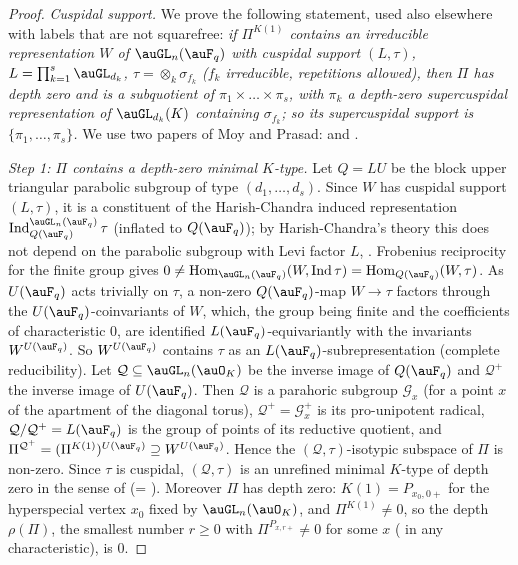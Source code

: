 \documentclass[10pt]{amsart}
\theoremstyle{definition}
\theoremstyle{remark}
\begin{document}
\begin{proof}
\emph{Cuspidal support.} We prove the following statement, used also elsewhere with labels that
are not squarefree: \emph{if $\Pi^{K(1)}$ contains an irreducible representation $W$ of
$\auGL_n(\auF_q)$ with cuspidal support $(L,\tau)$, $L=\prod_{k=1}^s\auGL_{d_k}$,
$\tau=\otimes_k\sigma_{f_k}$ ($f_k$ irreducible, repetitions allowed), then $\Pi$ has depth zero and
is a subquotient of $\pi_1\times\dots\times\pi_s$, with $\pi_k$ a depth-zero supercuspidal
representation of $\auGL_{d_k}(K)$ containing $\sigma_{f_k}$; so its supercuspidal support is
$\{\pi_1,\dots,\pi_s\}$.} We use two papers of Moy and Prasad: \cite{MoyPrasad94} and
\cite{MoyPrasad}.

\emph{Step 1: $\Pi$ contains a depth-zero minimal $K$-type.} Let $Q=LU$ be the block upper
triangular parabolic subgroup of type $(d_1,\dots,d_s)$. Since $W$ has cuspidal support $(L,\tau)$, it
is a constituent of the Harish-Chandra induced representation $\operatorname{Ind}_{Q(\auF_q)}^{
\auGL_n(\auF_q)}\tau$ (inflated to $Q(\auF_q)$); by Harish-Chandra's theory this does not depend on
the parabolic subgroup with Levi factor $L$, \cite[Proposition~6.1(1)]{MoyPrasad}. Frobenius
reciprocity for the finite group gives $0\ne\operatorname{Hom}_{\auGL_n(\auF_q)}(W,\operatorname{Ind}
\tau)=\operatorname{Hom}_{Q(\auF_q)}(W,\tau)$. As $U(\auF_q)$ acts trivially on $\tau$, a non-zero
$Q(\auF_q)$-map $W\to\tau$ factors through the $U(\auF_q)$-coinvariants of $W$, which, the group being
finite and the coefficients of characteristic $0$, are identified $L(\auF_q)$-equivariantly with the
invariants $W^{U(\auF_q)}$. So $W^{U(\auF_q)}$ contains $\tau$ as an $L(\auF_q)$-subrepresentation
(complete reducibility). Let $\mathcal Q\subseteq\auGL_n(\auO_K)$ be the inverse image of
$Q(\auF_q)$ and $\mathcal Q^+$ the inverse image of $U(\auF_q)$. Then $\mathcal Q$ is a parahoric
subgroup $\mathcal G_x$ (for a point $x$ of the apartment of the diagonal torus), $\mathcal Q^+=
\mathcal G_x^+$ is its pro-unipotent radical, $\mathcal Q/\mathcal Q^+=L(\auF_q)$ is the group of
points of its reductive quotient, and $\Pi^{\mathcal Q^+}=(\Pi^{K(1)})^{U(\auF_q)}\supseteq
W^{U(\auF_q)}$. Hence the $(\mathcal Q,\tau)$-isotypic subspace of $\Pi$ is non-zero. Since $\tau$ is
cuspidal, $(\mathcal Q,\tau)$ is an unrefined minimal $K$-type of depth zero in the sense of
\cite[\S3.4, (i)]{MoyPrasad} (= \cite[Definition~5.1(i)]{MoyPrasad94}). Moreover $\Pi$ has depth zero:
$K(1)=P_{x_0,0+}$ for the hyperspecial vertex $x_0$ fixed by $\auGL_n(\auO_K)$, and $\Pi^{K(1)}\ne0$, so
the depth $\rho(\Pi)$, the smallest number $r\ge0$ with $\Pi^{P_{x,r+}}\neq0$ for some $x$
\cite[Theorem~5.2(1)]{MoyPrasad94} (\cite[Theorem~3.5(1)]{MoyPrasad} in any characteristic), is $0$.


\end{proof}
\end{document}
